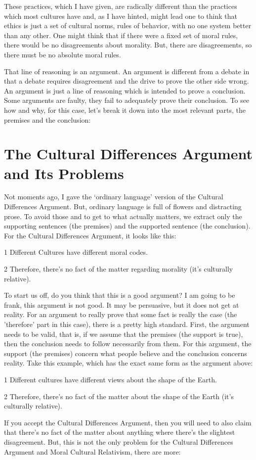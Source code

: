 These practices, which I have given, are radically different than the practices which most cultures have and, as I have hinted, might lead one to think that ethics is just a set of cultural norms, rules of behavior, with no one system better than any other. One might think that if there were a fixed set of moral rules, there would be no disagreements about morality. But, there are disagreements, so there must be no absolute moral rules. 

That line of reasoning is an argument. An argument is different from a debate in that a debate requires disagreement and the drive to prove the other side wrong. An argument is just a line of reasoning which is intended to prove a conclusion. Some arguments are faulty, they fail to adequately prove their conclusion. To see how and why, for this case, let's break it down into the most relevant parts, the premises and the conclusion:

\section{The Cultural Differences Argument and Its Problems}

Not moments ago, I gave the `ordinary language' version of the Cultural Differences Argument. But, ordinary language is full of flowers and distracting prose. To avoid those and to get to what actually matters, we extract only the supporting sentences (the premises) and the supported sentence (the conclusion). For the Cultural Differences Argument, it looks like this: 

\begin{earg}
\item[1] Different Cultures have different moral codes.
\item[2] Therefore, there's no fact of the matter regarding morality (it's culturally relative).
\end{earg}

To start us off, do you think that this is a good argument? I am going to be frank, this argument is not good. It may be persuasive, but it does not get at reality. For an argument to really prove that some fact is really the case (the 'therefore' part in this case), there is a pretty high standard. First, the argument needs to be valid, that is, if we assume that the premises (the support is true), then the conclusion needs to follow necessarily from them. For this argument, the support (the premises) concern what people believe and the conclusion concerns reality. Take this example, which has the exact same form as the argument above:
\begin{earg}
\item[1] Different cultures have different views about the shape of the Earth.
\item[2] Therefore, there's no fact of the matter about the shape of the Earth (it's culturally relative).
\end{earg}
If you accept the Cultural Differences Argument, then you will need to also claim that there's no fact of the matter about anything where there's the slightest disagreement. But, this is not the only problem for the Cultural Differences Argument and Moral Cultural Relativism, there are more:

